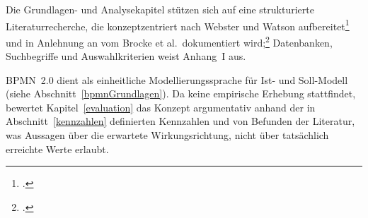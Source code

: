 Die Grundlagen- und Analysekapitel st\"utzen sich auf eine strukturierte Literaturrecherche, die konzeptzentriert nach Webster und Watson aufbereitet\footcite[Vgl.][hier S.~xvii]{Webster2002} und in Anlehnung an vom Brocke et al.~dokumentiert wird;\footcite[Vgl.][o.~S.]{VomBrocke2009} Datenbanken, Suchbegriffe und Auswahlkriterien weist Anhang~I aus.

BPMN~2.0 dient als einheitliche Modellierungssprache f\"ur Ist- und Soll-Modell (siehe Abschnitt~\ref{bpmnGrundlagen}). Da keine empirische Erhebung stattfindet, bewertet Kapitel~\ref{evaluation} das Konzept argumentativ anhand der in Abschnitt~\ref{kennzahlen} definierten Kennzahlen und von Befunden der Literatur, was Aussagen \"uber die erwartete Wirkungsrichtung, nicht \"uber tats\"achlich erreichte Werte erlaubt.